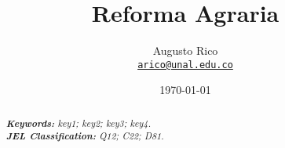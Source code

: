 \documentclass[11pt]{article}
\title{Reforma Agraria
}
\author{Augusto Rico\\
    \href{mailto:arico@unal.edu.co}{\texttt{arico@unal.edu.co}}
    }
\date{\today}
\begin{document}
{ %
\maketitle
\begin{abstract}
\lipsum[1] %
\noindent
\textit{\textbf{Keywords: }%
key1; key2; key3; key4.} \\ %
\noindent
\textit{\textbf{JEL Classification: }%
Q12; C22; D81.} %

\end{abstract}



}
\end{document}
